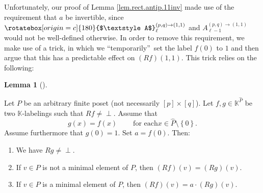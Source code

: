 \documentclass[numbers=enddot,12pt,final,onecolumn,notitlepage]{scrartcl}%
\theoremstyle{definition}
\newtheorem{lem}[theo]{Lemma}
\newenvironment{lemma}[1][]
{\begin{lem}[#1]\begin{leftbar}}
{\end{leftbar}\end{lem}}
\newcommand{\undf}{\operatorname*{\bot}}
\newcommand{\upslack}{\mathchoice{\rotatebox[origin=c]{180}{$\displaystyle A$}}{\rotatebox[origin=c]{180}{$\textstyle A$}}{\rotatebox[origin=c]{180}{$\scriptstyle A$}}{\rotatebox[origin=c]{180}{$\scriptscriptstyle A$}}}
\newcommand{\downslack}{A}
\begin{document}
Unfortunately, our proof of Lemma \ref{lem.rect.antip.11inv} made use of the
requirement that $a$ be invertible, since $\upslack_{\ell}^{\left(
p,q\right)  \rightarrow\left(  1,1\right)  }$ and $\downslack_{\ell
-1}^{\left(  p,q\right)  \rightarrow\left(  1,1\right)  }$ would not be
well-defined otherwise. In order to remove this requirement, we make use of a
trick, in which we \textquotedblleft temporarily\textquotedblright\ set the
label $f\left(  0\right)  $ to $1$ and then argue that this has a predictable
effect on $\left(  Rf\right)  \left(  1,1\right)  $. This trick relies on the following:

\begin{lemma}
\label{lem.ato1}Let $P$ be an arbitrary finite poset (not necessarily $\left[
p\right]  \times\left[  q\right]  $). Let $f,g\in\mathbb{K}^{\widehat{P}}$ be
two $\mathbb{K}$-labelings such that $Rf\neq\undf$. Assume that%
\begin{equation}
g\left(  x\right)  =f\left(  x\right)  \ \ \ \ \ \ \ \ \ \ \text{for each
}x\in\widehat{P}\setminus\left\{  0\right\}  . \label{eq.lem.ato1.ass1}%
\end{equation}
Assume furthermore that $g\left(  0\right)  =1$. Set $a=f\left(  0\right)  $. Then:

\begin{enumerate}
\item[\textbf{(a)}] We have $Rg\neq\undf$.

\item[\textbf{(b)}] If $v\in P$ is not a minimal element of $P$, then $\left(
Rf\right)  \left(  v\right)  =\left(  Rg\right)  \left(  v\right)  $.

\item[\textbf{(c)}] If $v\in P$ is a minimal element of $P$, then $\left(
Rf\right)  \left(  v\right)  =a\cdot\left(  Rg\right)  \left(  v\right)  $.
\end{enumerate}
\end{lemma}
\end{document}
